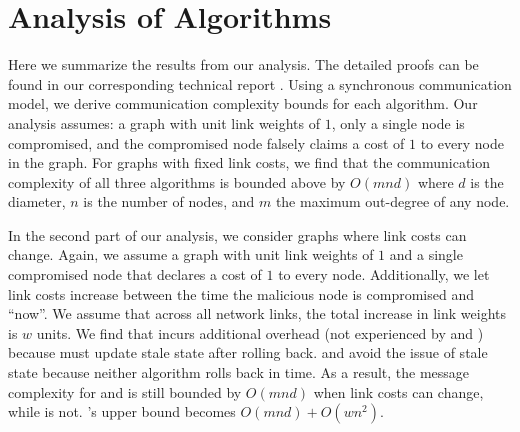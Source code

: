 
\section{Analysis of Algorithms}
\label{sec:analysis}

Here we summarize the results from our analysis.  The detailed proofs can be found in our corresponding technical report \cite{TechRollback10}. 
Using a synchronous communication model, we derive communication complexity bounds for each algorithm.  Our analysis assumes: a graph with unit link weights of $1$, only a single node is compromised,
and the compromised node
falsely claims a cost of $1$ to every node in the graph. %
For graphs with fixed link costs, we find that the communication complexity of all three algorithms is bounded above by $O(mnd)$  where $d$ is the diameter, $n$ is the number of nodes, and $m$ the maximum out-degree of any node.

In the second part of our analysis, we consider graphs where link costs can change. Again, we assume a graph with unit link weights of $1$ and a single compromised node that declares a cost of $1$ to every node.
Additionally, we let link costs increase between the time the malicious node is compromised and ``now''.  We assume that across all network links, the total increase in link weights is $w$ units.
We find that \cpr incurs additional overhead (not experienced by \second and \purges) because \cpr must update stale state after rolling back. 
\second and \purge avoid the issue of stale state because neither algorithm rolls back in time.  As a result, the message complexity for \second and \purge is still bounded by
$O(mnd)$ when link costs can change, while \cpr is not. \cprs's upper bound becomes $O(mnd) + O(wn^2)$. 




